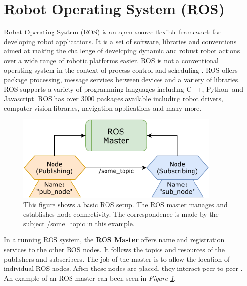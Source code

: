 \section{Robot Operating System (ROS)}
Robot Operating System (ROS) \cite{noauthor_rosorg_nodate} is an open-source flexible framework for developing robot applications. It is a set of software, libraries and conventions aimed at making the challenge of developing dynamic and robust robot actions over a wide range of robotic platforms easier. ROS is not a conventional operating system in the context of process control and scheduling \cite{quigley_ros_2009}. ROS offers package processing, message services between devices and a variety of libraries. ROS supports a variety of programming languages including C++, Python, and Javascript. ROS has over 3000 packages available including robot drivers, computer vision libraries, navigation applications and many more.

\begin{figure}[h]%
  \centering
  \includegraphics[width=0.9\textwidth]{graphics/rosmaster.pdf}
  \caption{This figure shows a basic ROS setup. The ROS master manages and establishes node connectivity. The correspondence is made by the subject /some\_topic in this example.}
  \label{fig:rosmaster}
\end{figure}

In a running ROS system, the \textbf{ROS Master} offers name and registration services to the other ROS nodes. It follows the topics and resources of the publishers and subscribers. The job of the master is to allow the location of individual ROS nodes. After these nodes are placed, they interact peer-to-peer \cite{wu_master_2018}. An example of an ROS master can been seen in \textit{Figure \ref{fig:rosmaster}}.


